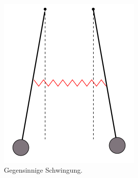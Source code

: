 \begin{figure}[H]
\begin{subfigure}[b]{0.3\textwidth}
		\includegraphics[width=\textwidth]{images/gegensinnig.png}
		\caption{Gegensinnige Schwingung.}
		\label{fig:gegensinnig}
	\end{subfigure}
	\hfill
	\begin{subfigure}[b]{0.3\textwidth}
		\centering

\end{subfigure}
\end{figure}
